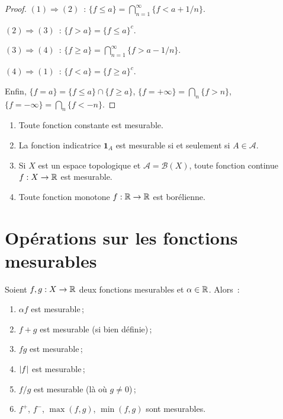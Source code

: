 \begin{proof}
$(1) \Rightarrow (2)$~: $\{f \leq a\} = \bigcap_{n=1}^{\infty} \{f < a + 1/n\}$.

$(2) \Rightarrow (3)$~: $\{f > a\} = \{f \leq a\}^c$.

$(3) \Rightarrow (4)$~: $\{f \geq a\} = \bigcap_{n=1}^{\infty} \{f > a - 1/n\}$.

$(4) \Rightarrow (1)$~: $\{f < a\} = \{f \geq a\}^c$.

Enfin, $\{f = a\} = \{f \leq a\} \cap \{f \geq a\}$,
$\{f = +\infty\} = \bigcap_n \{f > n\}$, $\{f = -\infty\} = \bigcap_n \{f < -n\}$.
\end{proof}

\begin{exemple}
\begin{enumerate}
    \item Toute fonction constante est mesurable.
    \item La fonction indicatrice $\mathbf{1}_A$ est mesurable si et seulement si
    $A \in \mathcal{A}$.
    \item Si $X$ est un espace topologique et $\mathcal{A} = \mathcal{B}(X)$, toute
    fonction continue $f : X \to \mathbb{R}$ est mesurable.
    \item Toute fonction monotone $f : \mathbb{R} \to \mathbb{R}$ est bor\'elienne.
\end{enumerate}
\end{exemple}

\section{Op\'erations sur les fonctions mesurables}

\begin{theoreme}
\label{thm:stabilite_algebrique}
Soient $f, g : X \to \mathbb{R}$ deux fonctions mesurables et $\alpha \in \mathbb{R}$. Alors~:
\begin{enumerate}
    \item $\alpha f$ est mesurable\,;
    \item $f + g$ est mesurable (si bien d\'efinie)\,;
    \item $fg$ est mesurable\,;
    \item $\left| f \right|$ est mesurable\,;
    \item $f/g$ est mesurable (l\`a o\`u $g \neq 0$)\,;
    \item $f^+$, $f^-$, $\max(f, g)$, $\min(f, g)$ sont mesurables.
\end{enumerate}
\end{theoreme}

